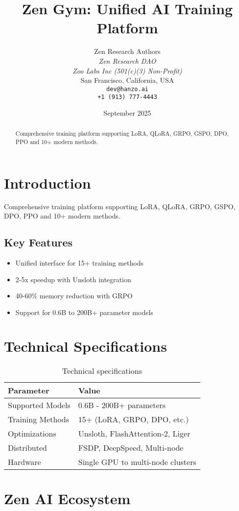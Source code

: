 \documentclass[11pt,a4paper]{article}
\title{Zen Gym: Unified AI Training Platform}
\author{
    Zen Research Authors \\
    \textit{Zen Research DAO} \\
    \textit{Zoo Labs Inc (501(c)(3) Non-Profit)} \\
    San Francisco, California, USA \\
    \texttt{dev@hanzo.ai} \\
    \texttt{+1 (913) 777-4443}
}
\date{September 2025}
\begin{document}
\maketitle

\begin{abstract}
Comprehensive training platform supporting LoRA, QLoRA, GRPO, GSPO, DPO, PPO and 10+ modern methods.
\end{abstract}

\section{Introduction}
Comprehensive training platform supporting LoRA, QLoRA, GRPO, GSPO, DPO, PPO and 10+ modern methods.

\subsection{Key Features}
\begin{itemize}
    \item Unified interface for 15+ training methods
    \item 2-5x speedup with Unsloth integration
    \item 40-60\% memory reduction with GRPO
    \item Support for 0.6B to 200B+ parameter models
\end{itemize}

\section{Technical Specifications}
\begin{table}[h]
\centering
\begin{tabular}{@{}ll@{}}
\toprule
\textbf{Parameter} & \textbf{Value} \\
\midrule
Supported Models & 0.6B - 200B+ parameters \\
Training Methods & 15+ (LoRA, GRPO, DPO, etc.) \\
Optimizations & Unsloth, FlashAttention-2, Liger \\
Distributed & FSDP, DeepSpeed, Multi-node \\
Hardware & Single GPU to multi-node clusters
\bottomrule
\end{tabular}
\caption{Technical specifications}
\label{tab:specs}
\end{table}

\section{Zen AI Ecosystem}
\end{document}
